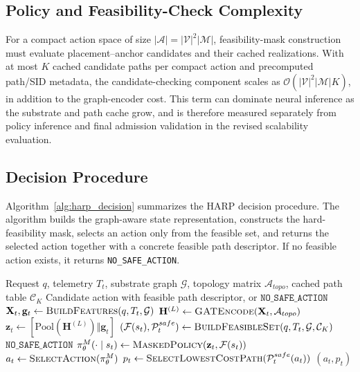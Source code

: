 \documentclass[final,5p]{elsarticle}
\newenvironment{revision}{\color{red}}{}
\begin{document}
\begin{revision}
\subsection{Policy and Feasibility-Check Complexity}
\label{subsec:harp_complexity}
For a compact action space of size \(|\mathcal{A}|=|\mathcal{V}|^2|\mathcal{M}|\), feasibility-mask construction must evaluate placement--anchor candidates and their cached realizations. With at most \(K\) cached candidate paths per compact action and precomputed path/SID metadata, the candidate-checking component scales as \(\mathcal{O}(|\mathcal{V}|^2|\mathcal{M}|K)\), in addition to the graph-encoder cost. This term can dominate neural inference as the substrate and path cache grow, and is therefore measured separately from policy inference and final admission validation in the revised scalability evaluation.
\end{revision}

\subsection{Decision Procedure}
\label{subsec:harp_decision_procedure}

Algorithm~\ref{alg:harp_decision} summarizes the HARP decision procedure. The algorithm builds the graph-aware state representation, constructs the hard-feasibility mask, selects an action only from the feasible set, and returns the selected action together with a concrete feasible path descriptor. If no feasible action exists, it returns \texttt{NO\_SAFE\_ACTION}.

\begin{algorithm}[t]
\caption{HARP decision procedure}
\label{alg:harp_decision}
\begin{algorithmic}[1]
\Require Request \(q\), telemetry \(T_t\), substrate graph \(\mathcal{G}\), topology matrix \(\mathcal{A}_{topo}\), cached path table \(\mathcal{C}_K\)
\Ensure Candidate action with feasible path descriptor, or \(\texttt{NO\_SAFE\_ACTION}\)
\State \(\mathbf{X}_t,\mathbf{g}_t \gets \textsc{BuildFeatures}(q,T_t,\mathcal{G})\)
\State \(\mathbf{H}^{(L)} \gets \textsc{GATEncode}(\mathbf{X}_t,\mathcal{A}_{topo})\)
\State \(\mathbf{z}_t \gets [\mathrm{Pool}(\mathbf{H}^{(L)})\Vert \mathbf{g}_t]\)
\State \((\mathcal{F}(s_t),\mathcal{P}^{safe}_t) \gets \textsc{BuildFeasibleSet}(q,T_t,\mathcal{G},\mathcal{C}_K)\)
    \State \Return \(\texttt{NO\_SAFE\_ACTION}\)
\EndIf
\State \(\pi_\theta^M(\cdot\mid s_t) \gets \textsc{MaskedPolicy}(\mathbf{z}_t,\mathcal{F}(s_t))\)
\State \(a_t \gets \textsc{SelectAction}(\pi_\theta^M)\)
\State \(p_t \gets \textsc{SelectLowestCostPath}(\mathcal{P}^{safe}_t(a_t))\)
\State \Return \((a_t,p_t)\)
\end{algorithmic}
\end{algorithm}
\end{document}
